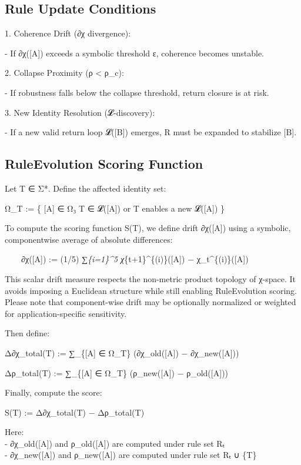 \subsection{Rule Update Conditions}\label{rule-update-conditions}

1. Coherence Drift (∂χ divergence):

- If ∂χ({[}A{]}) exceeds a symbolic threshold ε, coherence becomes
unstable.

2. Collapse Proximity (ρ \textless{} ρ\_c):

- If robustness falls below the collapse threshold, return closure is at
risk.

3. New Identity Resolution (𝓛-discovery):

- If a new valid return loop 𝓛({[}B{]}) emerges, R must be expanded to
stabilize {[}B{]}.

\subsection{RuleEvolution Scoring
Function}\label{ruleevolution-scoring-function}

Let T ∈ Σ*. Define the affected identity set:

Ω\_T := \{ {[}A{]} ∈ Ω₃ \textbar{} T ∈ 𝓛({[}A{]}) or T enables a new
𝓛({[}A{]}) \}

To compute the scoring function S(T), we define drift ∂χ({[}A{]}) using
a symbolic, componentwise average of absolute differences:

  ∂χ({[}A{]}) := (1/5) ∑\emph{\{i=1\}\^{}5
\textbar χ}\{t+1\}\^{}\{(i)\}({[}A{]}) −
χ\_t\^{}\{(i)\}({[}A{]})\textbar{}

This scalar drift measure respects the non-metric product topology of
χ-space. It avoids imposing a Euclidean structure while still enabling
RuleEvolution scoring. Please note that component-wise drift may be
optionally normalized or weighted for application-specific sensitivity.

Then define:

Δ∂χ\_total(T) := ∑\_\{{[}A{]} ∈ Ω\_T\} (∂χ\_old({[}A{]}) −
∂χ\_new({[}A{]}))

Δρ\_total(T) := ∑\_\{{[}A{]} ∈ Ω\_T\} (ρ\_new({[}A{]}) −
ρ\_old({[}A{]}))

Finally, compute the score:

S(T) := Δ∂χ\_total(T) − Δρ\_total(T)

Here:\\
- ∂χ\_old({[}A{]}) and ρ\_old({[}A{]}) are computed under rule set Rₜ\\
- ∂χ\_new({[}A{]}) and ρ\_new({[}A{]}) are computed under rule set Rₜ ∪
\{T\}


